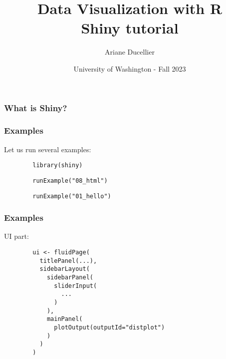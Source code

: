 \documentclass{beamer}
\title[Data Visualization with R - Shiny tutorial]{Data Visualization with R \\ Shiny tutorial}
\author{Ariane Ducellier}
\date{University of Washington - Fall 2023}
\begin{document}
	\begin{frame}
		\titlepage
	\end{frame}

	\begin{frame}
		\frametitle{What is Shiny?}
		
	\end{frame}

	\begin{frame}[fragile]
		\frametitle{Examples}

		Let us run several examples:

		\vspace{2em}

		\begin{exampleblock}{}
		\begin{BVerbatim}
		library(shiny)
		\end{BVerbatim}
		\end{exampleblock}{}

		\vspace{2em}

		\begin{exampleblock}{}
		\begin{BVerbatim}
		runExample("08_html")
		\end{BVerbatim}
		\end{exampleblock}{}

		\vspace{2em}

		\begin{exampleblock}{}
		\begin{BVerbatim}
		runExample("01_hello")
		\end{BVerbatim}
		\end{exampleblock}{}

	\end{frame}

	\begin{frame}[fragile]
		\frametitle{Examples}

		UI part:

		\begin{exampleblock}{}
		\begin{BVerbatim}
		ui <- fluidPage(
		  titlePanel(...),
		  sidebarLayout(
		    sidebarPanel(
		      sliderInput(
		        ...
		      )
		    ),
		    mainPanel(
		      plotOutput(outputId="distplot")
		    )
		  )
		)
		\end{BVerbatim}
		\end{exampleblock}{}

	\end{frame}
\end{document}
